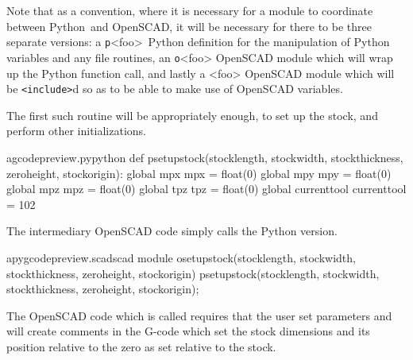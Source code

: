 \documentclass{ltxdoc}
\begin{document}
Note that as a convention, where it is necessary for a module to coordinate between 
Python~and OpenSCAD, it will be necessary for there to be three separate versions:
a \texttt{p}<foo>~Python definition for the manipulation of Python variables and
any file routines, an \texttt{o}<foo> OpenSCAD module which will wrap up the Python
function call, and lastly a <foo> OpenSCAD module which will be \texttt{<include>}d 
so as to be able to make use of OpenSCAD variables.

The first such routine will be appropriately enough, 
to set up the stock, and perform other initializations. 

\lstset{firstnumber=\thegcpy}
\begin{writecode}{a}{gcodepreview.py}{python}
def psetupstock(stocklength, stockwidth, stockthickness, zeroheight, stockorigin):
    global mpx
    mpx = float(0)
    global mpy
    mpy = float(0)
    global mpz
    mpz = float(0)
    global tpz
    tpz = float(0)
    global currenttool
    currenttool = 102

\end{writecode}
\addtocounter{gcpy}{12}

The intermediary OpenSCAD code simply calls the Python version. 

\lstset{firstnumber=\thepyscad}
\begin{writecode}{a}{pygcodepreview.scad}{scad}
 module osetupstock(stocklength, stockwidth, stockthickness, zeroheight, stockorigin) {
     psetupstock(stocklength, stockwidth, stockthickness, zeroheight, stockorigin);
 }
 
\end{writecode}
\addtocounter{pyscad}{4}

The OpenSCAD code which is called requires that the user set 
parameters and will create comments in the G-code which set the stock dimensions and its 
position relative to the zero as set relative to the stock.
 
\end{document}

